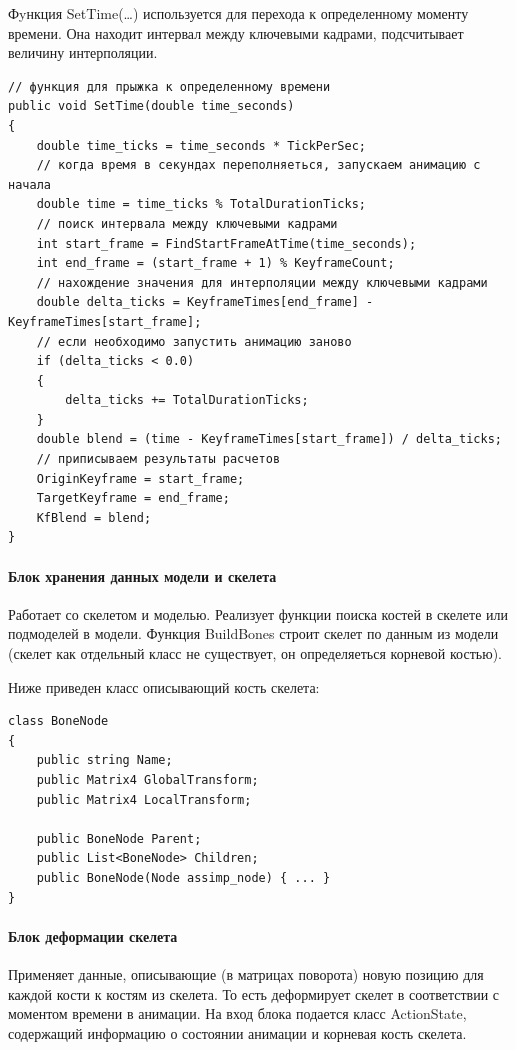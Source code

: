 Фyнкция SetTime(\dots) используется для перехода к определенному моменту времени. Она находит интервал между ключевыми кадрами, подсчитывает величину интерполяции.

\begin{verbatim}
// функция для прыжка к определенному времени
public void SetTime(double time_seconds)
{            
    double time_ticks = time_seconds * TickPerSec;
    // когда время в секундах переполняеться, запускаем анимацию с начала
    double time = time_ticks % TotalDurationTicks;
    // поиск интервала между ключевыми кадрами
    int start_frame = FindStartFrameAtTime(time_seconds);
    int end_frame = (start_frame + 1) % KeyframeCount;
    // нахождение значения для интерполяции между ключевыми кадрами
    double delta_ticks = KeyframeTimes[end_frame] - KeyframeTimes[start_frame];
    // если необходимо запустить анимацию заново
    if (delta_ticks < 0.0)
    {
        delta_ticks += TotalDurationTicks;
    }
    double blend = (time - KeyframeTimes[start_frame]) / delta_ticks;
    // приписываем результаты расчетов
    OriginKeyframe = start_frame;
    TargetKeyframe = end_frame;
    KfBlend = blend;
}
\end{verbatim}


\paragraph{Блок хранения данных модели и скелета}
Работает со скелетом и моделью.
Реализует функции поиска костей в скелете или подмоделей в модели.
Функция BuildBones строит скелет по данным из модели (скелет как отдельный класс не существует, он определяеться корневой костью).

Ниже приведен класс описывающий кость скелета:
\begin{verbatim}
class BoneNode
{
    public string Name;
    public Matrix4 GlobalTransform;
    public Matrix4 LocalTransform;

    public BoneNode Parent;
    public List<BoneNode> Children;
    public BoneNode(Node assimp_node) { ... }
}
\end{verbatim}


\paragraph{Блок деформации скелета}
Применяет данные, описывающие (в матрицах поворота) новую позицию для каждой кости к костям из скелета.
То есть деформирует скелет в соответствии с моментом времени в анимации. На вход блока подается класс ActionState, содержащий информацию о состоянии анимации и корневая кость скелета.

